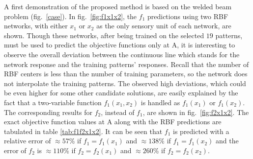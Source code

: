 A first demonstration of the proposed method is based on the welded
beam problem (fig.\ \ref{case}). In fig.\ \ref{fig:f1x1x2}, the $f_1$ predictions using two RBF networks, with either $x_1$ or $x_2$ as the only sensory unit of each network, are shown. Though these networks, after being trained on the selected $19$ patterns, must be used to predict the objective functions only at A, it is interesting to observe the overall deviation between the continuous line which stands for the network response and the training patterns' responses. 
Recall that the number of RBF centers is less than the number of training parameters, so the network does not interpolate the training patterns.
The observed high deviations, which could be even higher for some other candidate solutions, are easily explained by the fact that a two-variable function $f_1(x_1,x_2)$ is handled as $f_1(x_1)$ or $f_1(x_2)$. The corresponding results for $f_2$, instead of $f_1$, are shown in fig.\ \ref{fig:f2x1x2}. 
The exact objective function values at A along with the RBF predictions are tabulated in table \ref{tab:f1f2x1x2}. It can be seen that $f_1$ is predicted with a relative error of  $\approx \! 57\%$ if $f_1\!=\!f_1(x_1)$ and $\approx \! 138\%$ if $f_1\!=\!f_1(x_2)$ and the error of $f_2$ is  $\approx \! 110\%$ if $ f_2\!=\!f_2(x_1)$ and $\approx \! 260\%$ if $ f_2\!=\!f_2(x_2)$.


